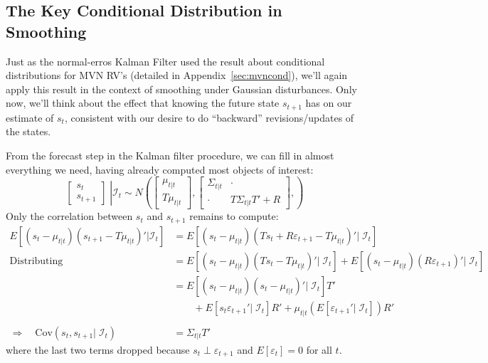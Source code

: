 \documentclass[a4paper,12pt]{article}
\begin{document}
\subsection{The Key Conditional Distribution in Smoothing}
\label{sec:smoothresult}

Just as the normal-erros Kalman Filter used the result about conditional
distributions for MVN RV's (detailed in Appendix~\ref{sec:mvncond}),
we'll again apply this result in the context of smoothing under Gaussian
disturbances. Only now, we'll think about the effect that knowing the
future state $s_{t+1}$ has on our estimate of $s_t$, consistent with our
desire to do ``backward'' revisions/updates of the states.

From the forecast step in the Kalman filter procedure, we can fill in
almost everything we need, having already computed most objects of
interest:  
\begin{equation}
  \label{smoothsetup}
  \left. \begin{bmatrix} s_t \\ s_{t+1} \end{bmatrix} \;\right\rvert
  \mathcal{I}_t
  \sim N\left( 
  \begin{bmatrix} \mu_{t|t} \\ T\mu_{t|t} \end{bmatrix}, 
  \begin{bmatrix} \Sigma_{t|t} & \cdot \\ 
                  \cdot & T\Sigma_{t|t} T'+R \end{bmatrix}, 
  \right)
\end{equation}
Only the correlation between $s_t$ and $s_{t+1}$ remains to compute:
\begin{align*}
  E\left[(s_t-\mu_{t|t})(s_{t+1}-T\mu_{t|t})' | \mathcal{I}_t\right] &=
    E\left[(s_t-\mu_{t|t})(Ts_t + R\varepsilon_{t+1}-T\mu_{t|t})' |\;
      \mathcal{I}_t\right] \\
  \text{Distributing} \qquad
    &= E\left[(s_t-\mu_{t|t})(Ts_t -T\mu_{t|t})' |\;
      \mathcal{I}_t\right] 
    + E\left[(s_t-\mu_{t|t})(R\varepsilon_{t+1})' |\;
      \mathcal{I}_t\right] \\
  &= E\left[(s_t-\mu_{t|t})(s_t -\mu_{t|t})' |\;
      \mathcal{I}_t\right] T' \\
    &\qquad
    + E\left[s_t\varepsilon_{t+1}' |\;
      \mathcal{I}_t\right] R'
    + \mu_{t|t}\left(E\left[\varepsilon_{t+1}' |\;
      \mathcal{I}_t\right]\right)R' \\\\
  \Rightarrow\quad \text{Cov}(s_t, s_{t+1}|\; \mathcal{I}_t)
      &= \Sigma_{t|t}T' 
\end{align*}
where the last two terms dropped because $s_t \perp \varepsilon_{t+1}$
and $E[\varepsilon_t]=0$ for all $t$.
\end{document}
